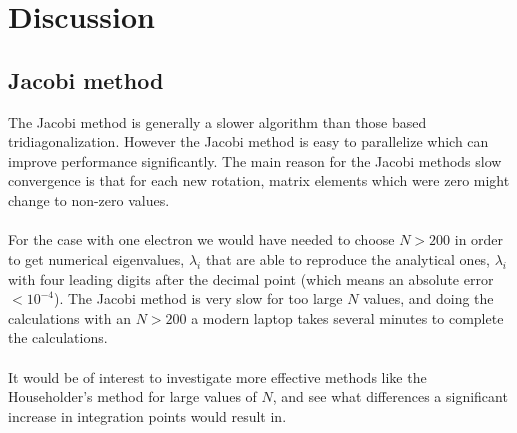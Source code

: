 \documentclass[a4paper, fontsize=11pt]{article}
\begin{document}



\section{Discussion}
\subsection{Jacobi method}
The Jacobi method is generally a slower algorithm than those based tridiagonalization. However the Jacobi method is easy to parallelize which can improve performance significantly. The main reason for the Jacobi methods slow convergence is that for each new rotation, matrix elements which were zero might change to non-zero values.


\paragraph{}
For the case with one electron we would have needed to choose $N > 200$ in order to get numerical eigenvalues, $\hat{\lambda}_i$ that are able to reproduce the analytical ones, $\lambda_i$ with four leading digits after the decimal point (which means an absolute error $< 10^{-4}$). The Jacobi method is very slow for too large $N$ values, and doing the calculations with an $N > 200$ a modern laptop takes several minutes to complete the calculations. 

\paragraph{}
It would be of interest to investigate more effective methods like the Householder's method for large values of $N$, and see what differences a significant increase in integration points would result in.



\end{document}
